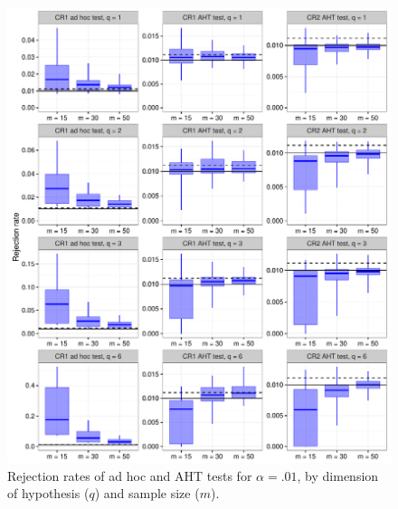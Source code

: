 \documentclass{article}\usepackage[]{graphicx}\usepackage[]{color}
\newenvironment{knitrout}{}{} %
\begin{document}
\begin{knitrout}
\color{fgcolor}\begin{figure}[H]

{\centering \includegraphics[width=\linewidth]{CR_fig/overview_01-1} 

}

\caption[Rejection rates of ad hoc and AHT tests for ]{Rejection rates of ad hoc and AHT tests for $\alpha = .01$, by dimension of hypothesis ($q$) and sample size ($m$).}\label{fig:overview_01}
\end{figure}


\end{knitrout}
\end{document}

